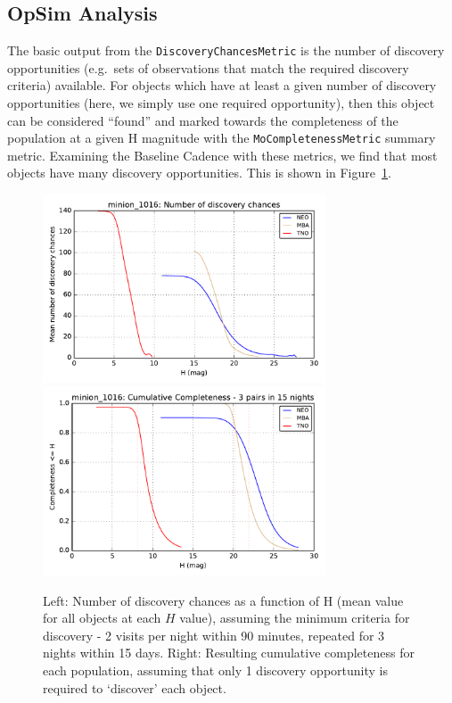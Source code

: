 \subsection{OpSim Analysis}
\label{sec:\secname:analysis}

The basic output from the {\tt DiscoveryChancesMetric} is the number
of discovery opportunities (e.g.\ sets of observations that match the
required discovery criteria) available. For objects which have at
least a given number of discovery opportunities (here, we simply use
one required opportunity), then this object can be considered
``found'' and marked towards the completeness of the population at a
given H magnitude with the {\tt MoCompletenessMetric} summary metric.
Examining the  Baseline Cadence with these metrics,
we find that most objects have many discovery opportunities. This is shown in
Figure~\ref{standard_discovery}.

\begin{figure}
\includegraphics[width=3.3in]{figs/solarsystem/minion_1016_DiscoveryChances_tno_mba_neo_10_year_3_pairs_in_15_nights_MOOB_ComboMetricVsH}
\includegraphics[width=3.3in]{figs/solarsystem/minion_1016_CumulativeCompleteness_tno_mba_neo_10_year_3_pairs_in_15_nights_MOOB_ComboMetricVsH}
\caption{Left: Number of discovery chances as a function of H
  (mean value for all objects at each $H$ value), assuming the minimum criteria for
  discovery - 2 visits per night within 90 minutes, repeated for 3
  nights within 15 days. Right: Resulting cumulative completeness for
  each population, assuming that only 1 discovery opportunity is
  required to `discover' each object.
\label{standard_discovery}}
\end{figure}

